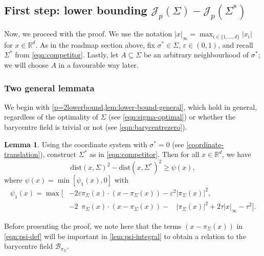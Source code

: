 \documentclass[preprint, reqno]{amsart}
\renewcommand{\epsilon}{\varepsilon}
\newcommand{\dist}{\mathrm{dist}}
\theoremstyle{definition}
\newtheorem{lemma}[definition]{Lemma}
\numberwithin{equation}{section}
\begin{document}
\subsection{First step: lower bounding $\mathscr
  J_p(\Sigma) - \mathscr J_p(\Sigma^*)$} \label{sec:first-main-step}

Now, we proceed with the proof. We use the notation $|x|_{\infty} =
\max_{i \in \{1, \dots, d\}}|x_i|$ for $x \in \mathbb{R}^d$. As in the
roadmap section above, fix $\sigma^* \in \Sigma$, $\epsilon \in
(0,1)$, and recall $\Sigma^*$ from \eqref{eqn:competitor}.
Lastly, let
$A \subseteq \Sigma$ be an arbitrary neighbourhood of $\sigma^*$; we
will choose $A$ in a favourable way later.

\subsubsection{Two general lemmata}
We begin with \cref{p=2lowerbound,lem:lower-bound-general}, which hold
in general, regardless of the optimality of $\Sigma$ (see
\eqref{eqn:sigma-optimal}) or whether the barycentre field is trivial
or not (see \eqref{eqn:barycentrezero}).
\begin{lemma}\label{p=2lowerbound}
  Using the coordinate system with $\sigma^* = 0$
  (see \eqref{coordinate-translation}), construct $\Sigma^*$ as in
  \eqref{eqn:competitor}. Then for all $x \in \mathbb{R}^d$, we have
  \[
    \dist(x, \Sigma)^2 - \dist(x, \Sigma^*)^2 \geq \psi(x),
  \]
  where $\psi (x) =\min [ \psi_1(x), 0]$ with
  \begin{align}\label{eqn:psi-def}
    \psi_1(x) =
    \max [
    & -\!2\epsilon \pi_{\Sigma}(x)\cdot (x- \pi_{\Sigma}(x)) -
      \epsilon^2 |\pi_{\Sigma}(x)|^2, \\\nonumber
    &
      -\!2\phantom{\epsilon}\pi_{\Sigma}(x)\cdot (x - \pi_{\Sigma}(x))
      - \phantom{\epsilon^2} |
      \pi_{\Sigma}(x)|^2 + 2 \tau|x |_{\infty} - \tau^2].
  \end{align}
\end{lemma}
Before presenting the proof, we note here that the terms $(x -
\pi_{\Sigma}(x))$ in \eqref{eqn:psi-def} will be important in
\cref{lem:psi-integral} to obtain a relation to the barycentre field
$\mathcal{B}_{\pi_\Sigma}$.
\end{document}
